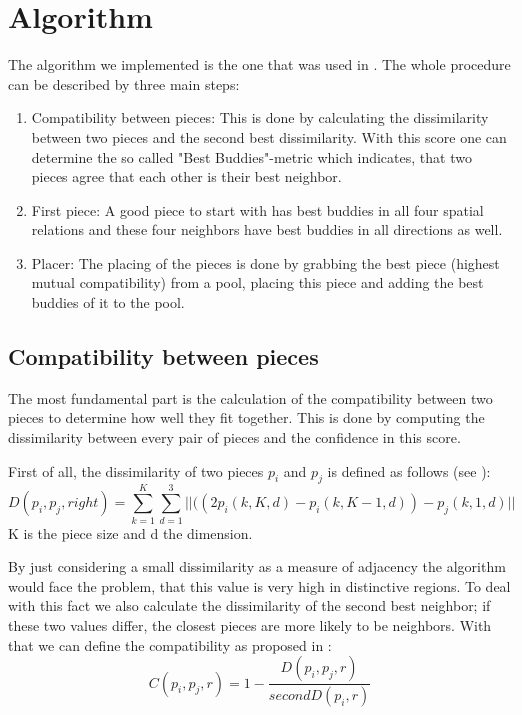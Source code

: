 \documentclass[11pt]{report}
\begin{document}
\section{Algorithm}
The algorithm we implemented is the one that was used in \cite{Paikin2015}. The whole procedure can be described by three main steps:
\begin{enumerate}
	\item Compatibility between pieces: This is done by calculating the dissimilarity between two pieces and the second best dissimilarity. With this score one can determine the so called "Best Buddies"-metric which indicates, that two pieces agree that each other is their best neighbor.
	\item First piece: A good piece to start with has best buddies in all four spatial relations and these four neighbors have best buddies in all directions as well.
	\item Placer: The placing of the pieces is done by grabbing the best piece (highest mutual compatibility) from a pool, placing this piece and adding the best buddies of it to the pool.
\end{enumerate}

\subsection{Compatibility between pieces}
The most fundamental part is the calculation of the compatibility between two pieces to determine how well they fit together. This is done by computing the dissimilarity between every pair of pieces and the confidence in this score.

First of all, the dissimilarity of two pieces $p_i$ and $p_j$ is defined as follows (see \cite{Paikin2015}): 
\begin{equation}\label{eq:dissimilarity}
D(p_i,p_j,right) = \sum_{k=1}^K \sum_{d=1}^3 ||((2p_i(k,K,d) - p_i(k,K-1,d)) - p_j(k,1,d) ||
\end{equation}
K is the piece size and d the dimension.

By just considering a small dissimilarity as a measure of adjacency the algorithm would face the problem, that this value is very high in distinctive regions. To deal with this fact we also calculate the dissimilarity of the second best neighbor; if these two values differ, the closest pieces are more likely to be neighbors. With that we can define the compatibility as proposed in \cite{Paikin2015}:
\begin{equation}\label{eq:compatibility}
C(p_i,p_j,r) = 1 - \frac{D(p_i,p_j,r)}{secondD(p_i,r)}
\end{equation}
\end{document}
